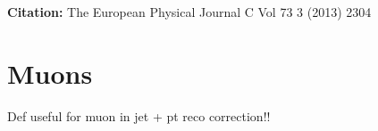 \textbf{Citation:} The European Physical Journal C Vol 73 3 (2013) 2304



\FloatBarrier
\clearpage


\clearpage


\section{Muons}
\label{sec:muons}

Def useful for muon in jet + pt reco correction!!


